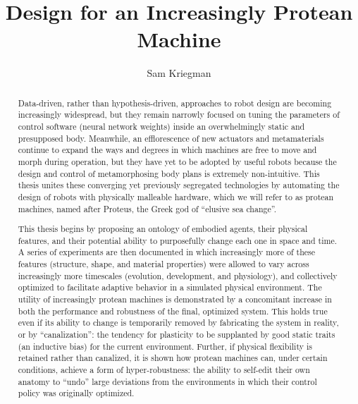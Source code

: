 \documentclass[12pt]{report}
\title{Design for an Increasingly Protean Machine}
\author{Sam Kriegman}
\begin{document}
\maketitle



\begin{abstract}
	
\vspace{10mm}


Data-driven, rather than hypothesis-driven, 
approaches to robot design are becoming increasingly widespread, but they remain narrowly focused on tuning the parameters of control software (neural network weights) inside an overwhelmingly static and presupposed body.
Meanwhile, an efflorescence of new actuators and metamaterials continue to expand the ways and degrees in which machines are free to 
move and morph
during operation, 
but they have yet to be adopted by useful robots because 
the design and control of 
metamorphosing body plans 
is extremely
non-intuitive.
This thesis unites these 
converging yet previously 
segregated
technologies
by automating the design of robots with physically malleable hardware,
which we will refer to as protean machines, named after Proteus, the Greek god of ``elusive sea change''.

This thesis begins by proposing an ontology of embodied agents, their physical features, and their potential ability to purposefully change each one in space and time.
A series of experiments are then documented in which increasingly more of these features (structure, shape, and material properties) were allowed to vary across increasingly more timescales (evolution, development, and physiology), and collectively optimized to facilitate 
adaptive
behavior in a simulated physical environment.
The utility of increasingly protean machines is demonstrated by a concomitant increase in both the performance and robustness of the final, optimized system.
This holds true even if its ability to change is temporarily removed by fabricating the system in reality, or by ``canalization'': the tendency for plasticity to be supplanted by good static traits (an inductive bias) for the current environment.
Further, if physical flexibility is retained rather than canalized, it is shown how protean machines can, under certain conditions, achieve a form of hyper-robustness: the ability to self-edit their own anatomy to ``undo'' large deviations from the environments in which their control policy was originally optimized.


\end{abstract}
\end{document}
